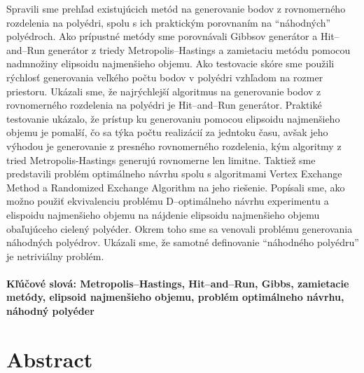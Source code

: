 \documentclass[12pt, twoside]{book}
\begin{document}
Spravili sme prehľad existujúcich metód na generovanie bodov z rovnomerného rozdelenia na polyédri, spolu s ich praktickým porovnaním na ``náhodných'' polyédroch. 
Ako prípustné metódy sme porovnávali Gibbsov generátor a Hit--and--Run generátor z triedy Metropolis--Hastings a zamietaciu metódu pomocou nadmnožiny elipsoidu najmenšieho objemu. Ako testovacie skóre sme použili rýchlosť generovania veľkého počtu bodov v polyédri vzhľadom na rozmer priestoru. Ukázali sme, že najrýchlejší algoritmus na generovanie bodov z rovnomerného rozdelenia na polyédri je Hit--and--Run generátor. Praktiké testovanie ukázalo, že prístup ku generovaniu pomocou elipsoidu najmenšieho objemu je pomalší, čo sa týka počtu realizácií za jedntoku času, avšak jeho výhodou je generovanie z presného rovnomerného rozdelenia, kým algoritmy z tried Metropolis-Hastings generujú rovnomerne len limitne. Taktiež sme predstavili problém optimálneho návrhu spolu s algoritmami Vertex Exchange Method a Randomized Exchange Algorithm na jeho riešenie. Popísali sme, ako možno použiť ekvivalenciu problému D--optimálneho návrhu experimentu a elispoidu najmenšieho objemu na nájdenie elipsoidu najmenšieho objemu obaľujúceho cielený polyéder. Okrem toho sme sa venovali problému generovania náhodných polyédrov. Ukázali sme, že samotné definovanie ``náhodného polyédru'' je netriviálny problém.

\paragraph*{Kľúčové slová: Metropolis--Hastings, Hit--and--Run, Gibbs, zamietacie metódy, elipsoid najmenšieho objemu, problém optimálneho návrhu, náhodný polyéder}


\newpage 
\section*{Abstract}
\end{document}
